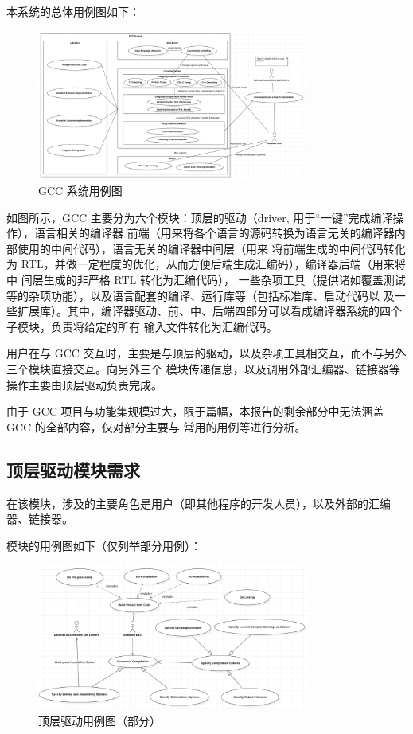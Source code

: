 \documentclass[12pt]{ctexrep}
\begin{document}
    本系统的总体用例图如下：

    \begin{figure}[h]
        \centering
        \includegraphics[width=0.8\textwidth]{pics/systemwide usecases.png}
        \caption{GCC 系统用例图}
    \end{figure}

    如图所示，GCC 主要分为六个模块：顶层的驱动（driver, 用于``一键''完成编译操作），语言相关的编译器
    前端（用来将各个语言的源码转换为语言无关的编译器内部使用的中间代码），语言无关的编译器中间层（用来
    将前端生成的中间代码转化为 RTL，并做一定程度的优化，从而方便后端生成汇编码），编译器后端（用来将中
    间层生成的非严格 RTL 转化为汇编代码）\cite{gcc-structure}，
    一些杂项工具（提供诸如覆盖测试等的杂项功能），以及语言配套的编译、运行库等（包括标准库、启动代码以
    及一些扩展库）。其中，编译器驱动、前、中、后端四部分可以看成编译器系统的四个子模块，负责将给定的所有
    输入文件转化为汇编代码。

    用户在与 GCC 交互时，主要是与顶层的驱动，以及杂项工具相交互，而不与另外三个模块直接交互。向另外三个
    模块传递信息，以及调用外部汇编器、链接器等操作主要由顶层驱动负责完成。

    由于 GCC 项目与功能集规模过大，限于篇幅，本报告的剩余部分中无法涵盖 GCC 的全部内容，仅对部分主要与
    常用的用例等进行分析。

    \subsection{顶层驱动模块需求}

    在该模块，涉及的主要角色是用户（即其他程序的开发人员），以及外部的汇编器、链接器。

    模块的用例图如下（仅列举部分用例）：

    \begin{figure}[hp]
        \centering
        \includegraphics[width=0.8\textwidth]{pics/topentry usecases.png}
        \caption{顶层驱动用例图（部分）}
    \end{figure}
\end{document}
